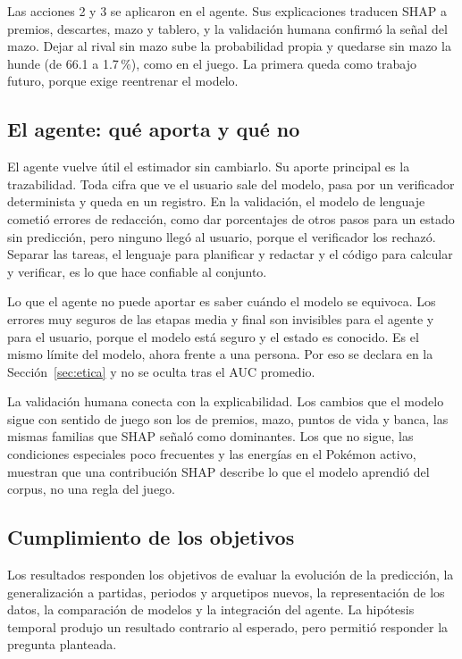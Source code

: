 Las acciones 2 y 3 se aplicaron en el agente. Sus explicaciones traducen
SHAP a premios, descartes, mazo y tablero, y la validación humana confirmó
la señal del mazo. Dejar al rival sin mazo sube la probabilidad propia y
quedarse sin mazo la hunde (de 66.1 a 1.7\,\%), como en el juego. La
primera queda como trabajo futuro, porque exige reentrenar el modelo.

\subsection{El agente: qué aporta y qué no}
\label{subsec:discusionagente}

El agente vuelve útil el estimador sin cambiarlo. Su aporte principal es
la trazabilidad. Toda cifra que ve el usuario sale del modelo, pasa por
un verificador determinista y queda en un registro. En la validación, el
modelo de lenguaje cometió errores de redacción, como dar porcentajes de
otros pasos para un estado sin predicción, pero ninguno llegó al usuario,
porque el verificador los rechazó. Separar las tareas, el lenguaje para
planificar y redactar y el código para calcular y verificar, es lo que
hace confiable al conjunto.

Lo que el agente no puede aportar es saber cuándo el modelo se equivoca.
Los errores muy seguros de las etapas media y final son invisibles para el
agente y para el usuario, porque el modelo está seguro y el estado es conocido.
Es el mismo límite del modelo, ahora frente a una persona. Por eso se
declara en la Sección~\ref{sec:etica} y no se oculta tras el AUC promedio.

La validación humana conecta con la explicabilidad. Los cambios que el
modelo sigue con sentido de juego son los de premios, mazo, puntos de vida
y banca, las mismas familias que SHAP señaló como dominantes. Los que no
sigue, las condiciones especiales poco frecuentes y las energías en el
Pok\'emon activo, muestran que una contribución SHAP describe lo que el
modelo aprendió del corpus, no una regla del juego.

\subsection{Cumplimiento de los objetivos}
\label{subsec:objetivoscumplidos}

Los resultados responden los objetivos de evaluar la evolución de la
predicción, la generalización a partidas, periodos y arquetipos nuevos, la
representación de los datos, la comparación de modelos y la integración del
agente. La hipótesis temporal produjo un resultado contrario al esperado,
pero permitió responder la pregunta planteada.

